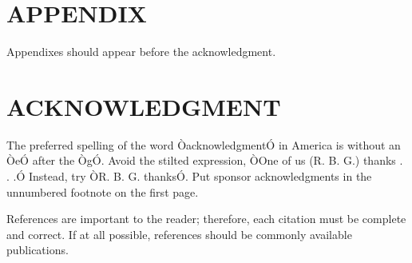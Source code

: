 \documentclass[letterpaper, 10 pt, conference]{ieeeconf}  %
\begin{document}
\section*{APPENDIX}

Appendixes should appear before the acknowledgment.

\section*{ACKNOWLEDGMENT}

The preferred spelling of the word ÒacknowledgmentÓ in America is without an ÒeÓ after the ÒgÓ. Avoid the stilted expression, ÒOne of us (R. B. G.) thanks . . .Ó  Instead, try ÒR. B. G. thanksÓ. Put sponsor acknowledgments in the unnumbered footnote on the first page.




References are important to the reader; therefore, each citation must be complete and correct. If at all possible, references should be commonly available publications.
\end{document}
